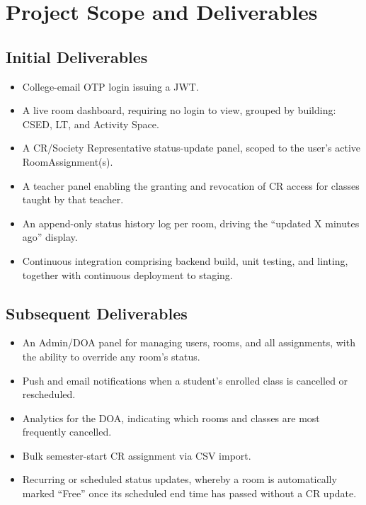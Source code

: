 \documentclass[11pt]{article}
\begin{document}
\section{Project Scope and Deliverables}

\subsection{Initial Deliverables}

\begin{itemize}
    \item College-email OTP login issuing a JWT.
    \item A live room dashboard, requiring no login to view, grouped by building: CSED, LT, and Activity Space.
    \item A CR/Society Representative status-update panel, scoped to the user's active RoomAssignment(s).
    \item A teacher panel enabling the granting and revocation of CR access for classes taught by that teacher.
    \item An append-only status history log per room, driving the ``updated X minutes ago'' display.
    \item Continuous integration comprising backend build, unit testing, and linting, together with continuous deployment to staging.
\end{itemize}

\subsection{Subsequent Deliverables}

\begin{itemize}
    \item An Admin/DOA panel for managing users, rooms, and all assignments, with the ability to override any room's status.
    \item Push and email notifications when a student's enrolled class is cancelled or rescheduled.
    \item Analytics for the DOA, indicating which rooms and classes are most frequently cancelled.
    \item Bulk semester-start CR assignment via CSV import.
    \item Recurring or scheduled status updates, whereby a room is automatically marked ``Free'' once its scheduled end time has passed without a CR update.
\end{itemize}
\end{document}
